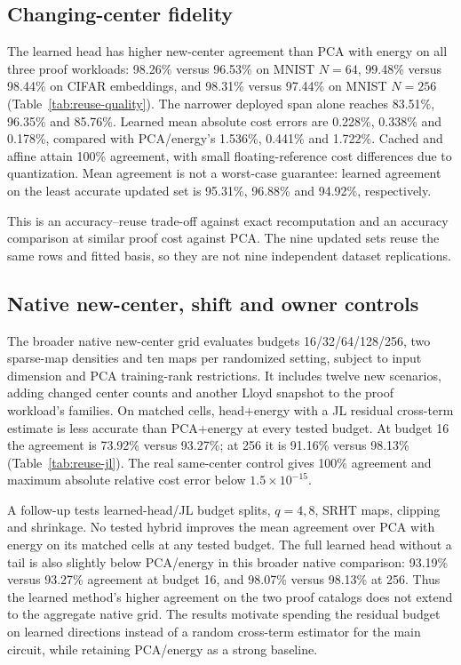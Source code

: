 \subsection{Changing-center fidelity}
The learned head has higher new-center agreement than PCA with energy on all three proof workloads: 98.26\% versus 96.53\% on MNIST $N=64$, 99.48\% versus 98.44\% on CIFAR embeddings, and 98.31\% versus 97.44\% on MNIST $N=256$ (Table~\ref{tab:reuse-quality}). The narrower deployed span alone reaches 83.51\%, 96.35\% and 85.76\%. Learned mean absolute cost errors are 0.228\%, 0.338\% and 0.178\%, compared with PCA/energy's 1.536\%, 0.441\% and 1.722\%. Cached and affine attain 100\% agreement, with small floating-reference cost differences due to quantization. Mean agreement is not a worst-case guarantee: learned agreement on the least accurate updated set is 95.31\%, 96.88\% and 94.92\%, respectively.

This is an accuracy--reuse trade-off against exact recomputation and an accuracy comparison at similar proof cost against PCA. The nine updated sets reuse the same rows and fitted basis, so they are not nine independent dataset replications.

\subsection{Native new-center, shift and owner controls}
The broader native new-center grid evaluates budgets 16/32/64/128/256, two sparse-map densities and ten maps per randomized setting, subject to input dimension and PCA training-rank restrictions. It includes twelve new scenarios, adding changed center counts and another Lloyd snapshot to the proof workload's families. On matched cells, head+energy with a JL residual cross-term estimate is less accurate than PCA+energy at every tested budget. At budget 16 the agreement is 73.92\% versus 93.27\%; at 256 it is 91.16\% versus 98.13\% (Table~\ref{tab:reuse-jl}). The real same-center control gives 100\% agreement and maximum absolute relative cost error below $1.5\times10^{-15}$.


A follow-up tests learned-head/JL budget splits, $q=4,8$, SRHT maps, clipping and shrinkage. No tested hybrid improves the mean agreement over PCA with energy on its matched cells at any tested budget. The full learned head without a tail is also slightly below PCA/energy in this broader native comparison: 93.19\% versus 93.27\% agreement at budget 16, and 98.07\% versus 98.13\% at 256. Thus the learned method's higher agreement on the two proof catalogs does not extend to the aggregate native grid. The results motivate spending the residual budget on learned directions instead of a random cross-term estimator for the main circuit, while retaining PCA/energy as a strong baseline.

